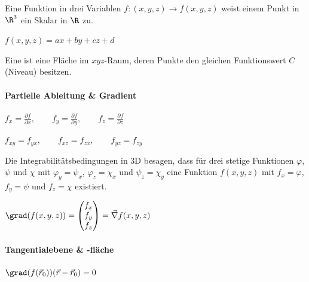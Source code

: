 
Eine Funktion in drei Variablen $f:(x,y,z)\to f(x,y,z)$ weist einem Punkt in $\R^3$ ein Skalar in $\R$ zu.
\begin{formulabox}
    $\displaystyle f(x,y,z)=ax+by+cz+d$
\end{formulabox}

Eine  ist eine Fläche im $xyz$-Raum, deren Punkte den gleichen Funktionswert $C$ (Niveau) besitzen.

\paragraph*{Partielle Ableitung \& Gradient}
\begin{formulabox}
    $\displaystyle f_x=\frac{\partial f}{\partial x},\qquad f_y=\frac{\partial f}{\partial y},\qquad f_z=\frac{\partial f}{\partial z}$
\end{formulabox}

\begin{formulabox}
    $\displaystyle f_{xy}=f_{yx},\qquad f_{xz}=f_{zx},\qquad f_{yz}=f_{zy}$
\end{formulabox}

Die Integrabilitätsbedingungen in 3D besagen, dass für drei stetige Funktionen $\varphi$, $\psi$ und $\chi$ mit $\varphi_y=\psi_x$, $\varphi_z=\chi_x$ und $\psi_z=\chi_y$ eine Funktion $f(x,y,z)$ mit $f_x=\varphi$, $f_y=\psi$ und $f_z=\chi$ existiert.

\begin{formulabox}
    $\displaystyle \grad(f(x,y,z))=\begin{pmatrix} f_x \\ f_y \\ f_z \end{pmatrix}=\vec{\nabla}f(x,y,z)$
\end{formulabox}

\paragraph*{Tangentialebene \& -fläche}
\begin{formulabox}
    $\displaystyle \grad(f(\vec r_0))(\vec r-\vec r_0)=0$
\end{formulabox}

